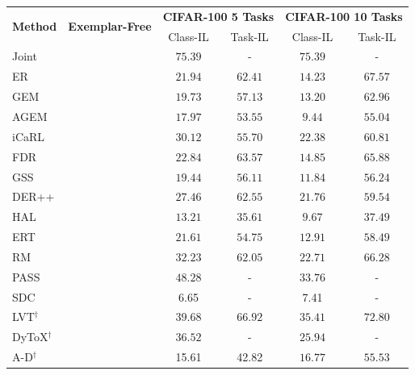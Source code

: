 \documentclass[twocolumn]{svjour3}          %
\newcommand{\cmark}{\ding{51}}%
\newcommand{\xmark}{\ding{55}}%
\begin{document}
\begin{table}[tb]
\centering
  \begin{tabular}{lccccc}
    \hline
    \multirow{2}{*}{\textbf{Method}}
    &\multirow{2}{*}{\textbf{Exemplar-Free}}
    &\multicolumn{2}{c}{\textbf{CIFAR-100 5 Tasks}}
    &\multicolumn{2}{c}{\textbf{CIFAR-100 10 Tasks}}\\
    & &Class-IL &Task-IL &Class-IL &Task-IL\\
    \hline
    Joint& \cmark& $75.39$ & - & $75.39$ & -\\
    \hline
    ER \hfill \citep{riemer2018learning}   & \xmark &$21.94$ &$62.41$ &$14.23$ &$67.57$\\
    GEM \hfill \citep{lopez2017gradient} & \xmark&$19.73$& $57.13$&$13.20$ & $62.96$\\
    AGEM \hfill \citep{chaudhry2018efficient} & \xmark &$17.97$ &$53.55$ & \phantom{0}$9.44$  &$55.04$ 
     \\
    iCaRL \hfill \citep{rebuffi2017icarl} & \xmark&$30.12$ &$55.70$ &$22.38$ &$60.81$ 
     \\
    FDR \hfill \citep{benjamin2018measuring}  & \xmark &$22.84$ &$63.57$ &$14.85$ &$65.88$ 
     \\
    GSS \hfill \citep{aljundi2019gradient}  & \xmark &$19.44$ &$56.11$ &$11.84$ &$56.24$ 
     \\
    DER++ \hfill \citep{buzzega2020dark} & \xmark &$27.46$ &$62.55$ &$21.76$ &$59.54$ 
     \\
    HAL \hfill \citep{chaudhry2021using}  & \xmark &$13.21$ &$35.61$ & \phantom{0}$9.67$ &$37.49$ 
    \\
    ERT \hfill \citep{buzzega2021rethinking}  & \xmark &$21.61$ &$54.75$ &$12.91$ &$58.49$ 
     \\
    RM \hfill \citep{bang2021rainbow}   &\xmark &$32.23$ &$62.05$ &$22.71$ &$66.28$ 
     \\
    PASS \hfill \citep{zhu2021prototype} & \cmark & $48.28$ & - & $33.76$ & -\\
    SDC \hfill \citep{yu2020semantic}
    & \cmark& \phantom{0}6.65 &-& \phantom{0}7.41&-\\
    \hline
    LVT$^{\dag}$ \hfill \citep{wang2022continual}&\xmark &$39.68$ &$66.92$ &$35.41$ &$72.80$  
     \\
    DyToX$^{\dag}$ \hfill \citep{douillard2022dytox} &\xmark & $36.52$ & -  & $25.94 $ & -  
     \\
    A-D$^{\dag}$ \hfill \citep{pelosin2022towards}
    & \cmark & 15.61 & 42.82 & $16.77$& $55.53$\\

\end{tabular}
\end{table}
\end{document}
